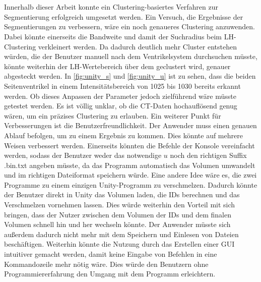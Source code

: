 \chapter{}
\label{sec:conclusion}


Innerhalb dieser Arbeit konnte ein Clustering-basiertes Verfahren zur Segmentierung erfolgreich umgesetzt werden. 
\newline
Ein Versuch, die Ergebnisse der Segmentierungen zu verbessern, wäre ein noch genaueres Clustering anzuwenden. Dabei könnte einerseits die Bandweite und damit der Suchradius beim LH-Clustering verkleinert werden. Da dadurch deutlich mehr Cluster entstehen würden, die der Benutzer manuell nach dem Ventrikelsystem durchsuchen müsste, könnte weiterhin der LH-Wertebereich über dem geclustert wird, genauer abgesteckt werden. In \autoref{fig:unity_s} und \autoref{fig:unity_u} ist zu sehen, dass die beiden Seitenventrikel in einem Intensitätsbereich von 1025 bis 1030 bereits erkannt werden. Ob dieses Anpassen der Parameter jedoch zielführend wäre müsste getestet werden. Es ist völlig unklar, ob die CT-Daten hochauflösend genug wären, um ein präzises Clustering zu erlauben.
\newline
Ein weiterer Punkt für Verbesserungen ist die Benutzerfreundlichkeit. Der Anwender muss einen genauen Ablauf befolgen, um zu einem Ergebnis zu kommen. Dies könnte auf mehrere Weisen verbessert werden. Einerseits könnten die Befehle der Konsole vereinfacht werden, sodass der Benutzer weder das notwendige $u$ noch den richtigen Suffix .bin.txt  angeben müsste, da das Programm automatisch das Volumen umwandelt und im richtigen Dateiformat speichern würde.
\newline
Eine andere Idee wäre es, die zwei Programme zu einem einzigen Unity-Programm zu verschmelzen. Dadurch könnte der Benutzer direkt in Unity das Volumen laden, die IDs berechnen und das Verschmelzen vornehmen lassen. Dies würde weiterhin den Vorteil mit sich bringen, dass der Nutzer zwischen dem Volumen der IDs und dem finalen Volumen schnell hin und her wechseln könnte. Der Anwender müsste sich außerdem dadurch nicht mehr mit dem Speichern und Einlesen von Dateien beschäftigen. Weiterhin könnte die Nutzung durch das Erstellen einer GUI intuitiver gemacht werden, damit keine Eingabe von Befehlen in eine Kommandozeile mehr nötig wäre. Dies würde den Benutzern ohne Programmiererfahrung den Umgang mit dem Programm erleichtern.
\newline
